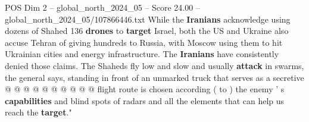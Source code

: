 \begin{textsample}{POS Dim 2 – global\_north\_2024\_05 – Score 24.00 – global\_north\_2024\_05/107866446.txt}
While the \textbf{Iranians} acknowledge using dozens of Shahed 136 \textbf{drones} to \textbf{target} Israel, both the US and Ukraine also accuse Tehran of giving hundreds to Russia, with Moscow using them to hit Ukrainian cities and energy infrastructure.
The \textbf{Iranians} have consistently denied those claims.
The Shaheds fly low and slow and usually \textbf{attack} in swarms, the general says, standing in front of an unmarked truck that serves as a secretive @ @ @ @ @ @ @ @ @ @ flight route is chosen according ( to ) the enemy ' s \textbf{capabilities} and blind spots of radars and all the elements that can help us reach the \textbf{target}."

\end{textsample}
